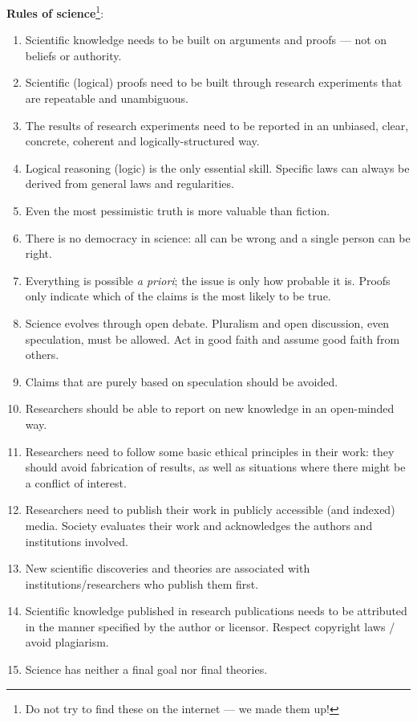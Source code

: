 \documentclass[graybox,envcountchap,sectrefs,UStrade]{svmono}
\begin{document}
\bigskip
{\footnotesize
\textbf{\textsf{Rules of science}}\footnote{Do not try to find these on the internet --- we made them up!}:\label{F:rules}
\begin{enumerate}
\setlength{\extrarowheight}{8pt}
\renewcommand{\labelenumi}{(\arabic{enumi})}
  \item Scientific knowledge needs to be built on arguments and proofs --- not on beliefs or authority.
  \item Scientific (logical) proofs need to be built through research experiments that are repeatable and unambiguous.
  \item The results of research experiments need to be reported in an unbiased, clear, concrete, coherent and logically-structured way.
  \item Logical reasoning (logic) is the only essential skill. Specific laws can always be derived from general laws and regularities.
  \item Even the most pessimistic truth is more valuable than fiction.
  \item There is no democracy in science: all can be wrong and a single person can be right.
  \item Everything is possible \emph{a priori}; the issue is only how probable it is. Proofs only indicate which of the claims is the most likely to be true.
  \item Science evolves through open debate. Pluralism and open discussion, even speculation, must be allowed. Act in good faith and assume good faith from others.
  \item Claims that are purely based on speculation should be avoided.
  \item Researchers should be able to report on new knowledge in an open-minded way.
  \item Researchers need to follow some basic ethical principles in their work: they should avoid fabrication of results, as well as situations where there might be a conflict of interest.
  \item Researchers need to publish their work in publicly accessible (and indexed) media. Society evaluates their work and acknowledges the authors and institutions involved.
  \item New scientific discoveries and theories are associated with institutions/researchers who publish them first.
  \item Scientific knowledge published in research publications needs to be attributed in the manner specified by the author or licensor. Respect copyright laws / avoid plagiarism.
  \item Science has neither a final goal nor final theories.
\end{enumerate}}
\bigskip
\end{document}
